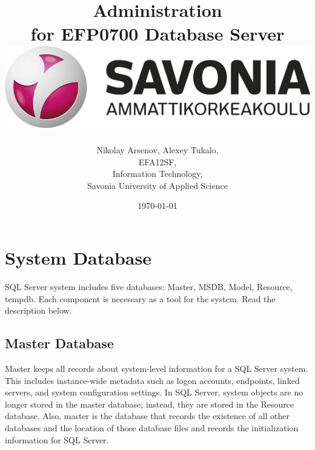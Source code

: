 \documentclass[english]{article}
\date{}
\begin{document}
\title{\vspace{2in}Administration\\
\small for EFP0700 Database Server\\
\vspace{0.5in}\includegraphics{savonia.jpg}}

\nopagebreak
\maketitle


\vspace{3in}

\author{
\begin{flushright}
Nikolay Arsenov, Alexey Tukalo,\\
EFA12SF,\\
Information Technology,\\
Savonia University of Applied Science
\end{flushright}
}

\date{\today}
\thispagestyle{empty}

\newpage
\setcounter{page}{1}
\setcounter{tocdepth}{2}
\tableofcontents

\newpage


\section{System Database}
SQL Server system includes five databases: Master, MSDB, Model, Resource, tempdb. Each component is necessary as a tool for the system. \cite{sysdb} Read the description below.
\subsection{Master Database}


Master keeps all records about system-level information for a SQL Server system. This includes instance-wide metadata such as logon accounts, endpoints, linked servers, and system configuration settings. In SQL Server, system objects are no longer stored in the master database; instead, they are stored in the Resource database. Also, master is the database that records the existence of all other databases and the location of those database files and records the initialization information for SQL Server.
\end{document}
